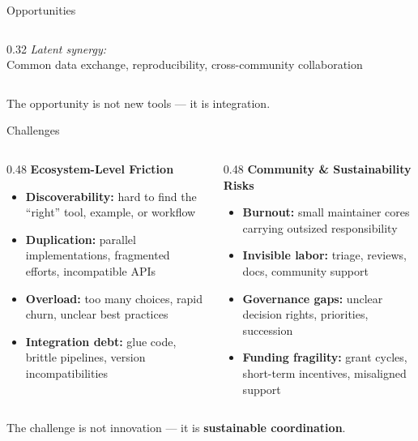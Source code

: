 \documentclass[11pt, aspectratio=169]{beamer}
\begin{document}
\begin{frame}{Opportunities}
\begin{columns}[T,onlytextwidth]
\begin{column}{0.32\textwidth}
\vspace{0.3cm}
{\small \textit{Latent synergy:}}\\
Common data exchange, reproducibility, cross-community collaboration
\end{column}

\end{columns}

\vspace{0.6cm}
\centering
{\large The opportunity is not new tools — it is integration.}

\end{frame}


\begin{frame}{Challenges}
\centering
\vspace{0.4cm}

\begin{columns}[T,onlytextwidth]
  \begin{column}{0.48\textwidth}
    \textbf{Ecosystem-Level Friction}
    \vspace{0.3cm}
    \begin{itemize}
      \item \textbf{Discoverability:} hard to find the “right” tool, example, or workflow
      \item \textbf{Duplication:} parallel implementations, fragmented efforts, incompatible APIs
      \item \textbf{Overload:} too many choices, rapid churn, unclear best practices
      \item \textbf{Integration debt:} glue code, brittle pipelines, version incompatibilities
    \end{itemize}
  \end{column}

  \begin{column}{0.48\textwidth}
    \textbf{Community \& Sustainability Risks}
    \vspace{0.3cm}
    \begin{itemize}
      \item \textbf{Burnout:} small maintainer cores carrying outsized responsibility
      \item \textbf{Invisible labor:} triage, reviews, docs, community support
      \item \textbf{Governance gaps:} unclear decision rights, priorities, succession
      \item \textbf{Funding fragility:} grant cycles, short-term incentives, misaligned support
    \end{itemize}
  \end{column}
\end{columns}

\vspace{0.6cm}
{\large The challenge is not innovation — it is \textbf{sustainable coordination}.}

\end{frame}
\end{document}

